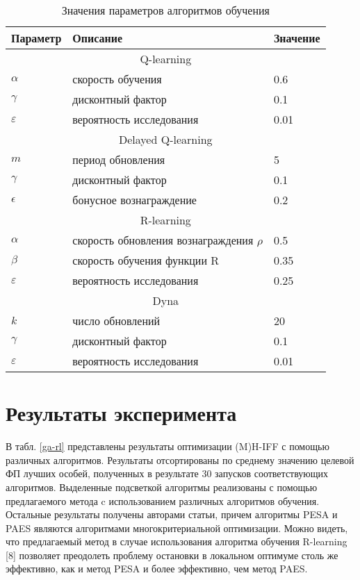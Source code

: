 \begin{table}[ht]
\begin{center}
\caption{Значения параметров алгоритмов обучения} \label{param-learning}
\begin{tabular}{|l|l|l|}
\hline
Параметр & Описание & Значение\\ \hline
\multicolumn{3}{|c|}{Q-learning \cite{sutton}}\\ \hline
$\alpha$ & скорость обучения & 0.6\\
$\gamma$ & дисконтный фактор & 0.1\\
$\varepsilon$ & вероятность исследования & 0.01\\ \hline
\multicolumn{3}{|c|}{Delayed Q-learning \cite{delayed}} \\ \hline
$m$ & период обновления & 5 \\
$\gamma$ & дисконтный фактор & 0.1\\
$\epsilon$ & бонусное вознаграждение & 0.2\\ \hline
\multicolumn{3}{|c|}{R-learning \cite{r-learning}}\\ \hline
$\alpha$ & скорость обновления вознаграждения $\rho$ & 0.5\\
$\beta$ & скорость обучения функции R & 0.35 \\
$\varepsilon$ & вероятность исследования & 0.25 \\ \hline
\multicolumn{3}{|c|}{Dyna \cite{sutton}}\\ \hline
$k$ & число обновлений & 20 \\
$\gamma$ & дисконтный фактор & 0.1 \\
$\varepsilon$ & вероятность исследования & 0.01 \\ \hline
\end{tabular}
\end{center}
\end{table}

\section{Результаты эксперимента}
\label{h-iff-results}

В табл. \ref{ga-rl} представлены результаты оптимизации (M)H-IFF с помощью различных алгоритмов. Результаты отсортированы по среднему значению целевой ФП лучших особей, полученных в результате 30 запусков соответствующих алгоритмов. Выделенные подсветкой алгоритмы реализованы с помощью предлагаемого метода c использованием различных алгоритмов обучения. Остальные результаты получены авторами статьи, причем алгоритмы PESA \cite{pesa} и PAES \cite{paes} являются алгоритмами многокритериальной оптимизации. Можно видеть, что предлагаемый метод в случае использования алгоритма обучения R-learning [8] позволяет преодолеть проблему остановки в локальном оптимуме столь же эффективно, как и метод PESA и более эффективно, чем метод PAES.

